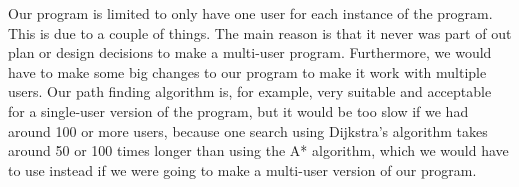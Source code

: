 Our program is limited to only have one user for each instance of the program. This is due to a couple of things. The main reason is that it never was part of out plan or design decisions to make a multi-user program. Furthermore, we would have to make some big changes to our program to make it work with multiple users. Our path finding algorithm is, for example, very suitable and acceptable for a single-user version of the program, but it would be too slow if we had around 100 or more users, because one search using Dijkstra's algorithm takes around 50 or 100 times longer than using the A* algorithm, which we would have to use instead if we were going to make a multi-user version of our program.
